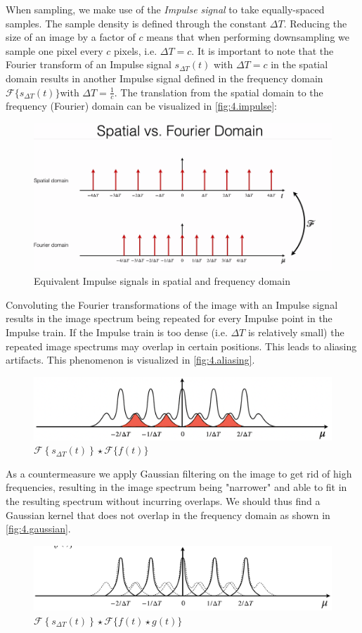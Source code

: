 \documentclass[tikz,14pt,fleqn]{article}
\begin{document}
When sampling, we make use of the \textit{Impulse signal} to take equally-spaced samples. The sample density is defined through the constant $\Delta T$. Reducing the size of an image by a factor of $c$ means that when performing downsampling we sample one pixel every $c$ pixels, i.e. $\Delta T = c$. It is important to note that the Fourier transform of an Impulse signal $s_{\Delta T}(t)$ with $\Delta T = c$  in the spatial domain results in another Impulse signal defined in the frequency domain $\mathscr{F}\{s_{\Delta T}(t)\}$with $\Delta T = \frac{1}{c}$. The translation from the spatial domain to the frequency (Fourier) domain can be visualized in \autoref{fig:4.impulse}:
\begin{figure}[H]
    \centering
    \includegraphics[width=0.4\linewidth]{./fig/3.spatialfourier.png}
    \caption{Equivalent Impulse signals in spatial and frequency domain}
    \label{fig:4.impulse}
\end{figure}

Convoluting the Fourier transformations of the image with an Impulse signal results in the image spectrum being repeated for every Impulse point in the Impulse train. If the Impulse train is too dense (i.e. $\Delta T$ is relatively small) the repeated image spectrums may overlap in certain positions. This leads to aliasing artifacts. This phenomenon is visualized in \autoref{fig:4.aliasing}.
\begin{figure}[H]
    \centering
    \includegraphics[width=0.8\linewidth]{fig/3.aliasing.png}
    \caption{$\mathscr{F}\left\{s_{\Delta T}(t)\right\} \star \mathscr{F}\{f(t)\}$}
    \label{fig:4.aliasing}
\end{figure}
As a countermeasure we apply Gaussian filtering on the image to get rid of high frequencies, resulting in the image spectrum being "narrower" and able to fit in the resulting spectrum without incurring overlaps.
We should thus find a Gaussian kernel that does not overlap in the frequency domain as shown in \autoref{fig:4.gaussian}.
\begin{figure}[H]
    \centering
    \includegraphics[width=0.8\linewidth]{fig/3.aliasing_gaussians.png}
    \caption{$\mathscr{F}\left\{s_{\Delta T}(t)\right\} \star \mathscr{F}\{f(t)\star g(t)\}$}
    \label{fig:4.gaussian}
\end{figure}
\end{document}
